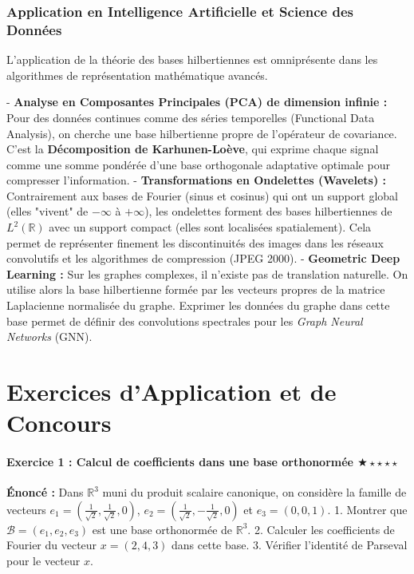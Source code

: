 \documentclass[11pt,a4paper]{article}
\begin{document}
\section{Application en Intelligence Artificielle et Science des Données}

L'application de la théorie des bases hilbertiennes est omniprésente dans les algorithmes de représentation mathématique avancés.

- \textbf{Analyse en Composantes Principales (PCA) de dimension infinie :} Pour des données continues comme des séries temporelles (Functional Data Analysis), on cherche une base hilbertienne propre de l'opérateur de covariance. C'est la \textbf{Décomposition de Karhunen-Loève}, qui exprime chaque signal comme une somme pondérée d'une base orthogonale adaptative optimale pour compresser l'information.
- \textbf{Transformations en Ondelettes (Wavelets) :} Contrairement aux bases de Fourier (sinus et cosinus) qui ont un support global (elles "vivent" de $-\infty$ à $+\infty$), les ondelettes forment des bases hilbertiennes de $L^2(\mathbb{R})$ avec un support compact (elles sont localisées spatialement). Cela permet de représenter finement les discontinuités des images dans les réseaux convolutifs et les algorithmes de compression (JPEG 2000).
- \textbf{Geometric Deep Learning :} Sur les graphes complexes, il n'existe pas de translation naturelle. On utilise alors la base hilbertienne formée par les vecteurs propres de la matrice Laplacienne normalisée du graphe. Exprimer les données du graphe dans cette base permet de définir des convolutions spectrales pour les \textit{Graph Neural Networks} (GNN).


\part{Exercices d'Application et de Concours}
\subsection*{Exercice 1 : Calcul de coefficients dans une base orthonormée $\bigstar\star\star\star\star$}

\textbf{Énoncé :}
Dans $\mathbb{R}^3$ muni du produit scalaire canonique, on considère la famille de vecteurs $e_1 = \left(\frac{1}{\sqrt{2}}, \frac{1}{\sqrt{2}}, 0\right)$, $e_2 = \left(\frac{1}{\sqrt{2}}, -\frac{1}{\sqrt{2}}, 0\right)$ et $e_3 = (0, 0, 1)$.
1. Montrer que $\mathcal{B} = (e_1, e_2, e_3)$ est une base orthonormée de $\mathbb{R}^3$.
2. Calculer les coefficients de Fourier du vecteur $x = (2, 4, 3)$ dans cette base.
3. Vérifier l'identité de Parseval pour le vecteur $x$.
\end{document}
